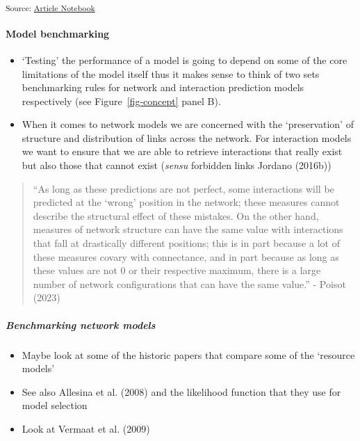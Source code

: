 \documentclass[
]{article}
\let\oldparagraph\paragraph
\renewcommand{\paragraph}[1]{\oldparagraph{#1}\mbox{}}
\let\oldsubparagraph\subparagraph
\renewcommand{\subparagraph}[1]{\oldsubparagraph{#1}\mbox{}}
\begin{document}
\textsubscript{Source:
\href{https://BecksLab.github.io/ms_t_is_for_topology/index.qmd.html}{Article
Notebook}}

\paragraph{Model benchmarking}\label{model-benchmarking}

\begin{itemize}
\item
  `Testing' the performance of a model is going to depend on some of the
  core limitations of the model itself thus it makes sense to think of
  two sets benchmarking rules for network and interaction prediction
  models respectively (see Figure~\ref{fig-concept} panel B).
\item
  When it comes to network models we are concerned with the
  `preservation' of structure and distribution of links across the
  network. For interaction models we want to ensure that we are able to
  retrieve interactions that really exist but also those that cannot
  exist (\emph{sensu} forbidden links Jordano (2016b))
\end{itemize}

\begin{quote}
``As long as these predictions are not perfect, some interactions will
be predicted at the `wrong' position in the network; these measures
cannot describe the structural effect of these mistakes. On the other
hand, measures of network structure can have the same value with
interactions that fall at drastically different positions; this is in
part because a lot of these measures covary with connectance, and in
part because as long as these values are not 0 or their respective
maximum, there is a large number of network configurations that can have
the same value.'' - Poisot (2023)
\end{quote}

\subparagraph{Benchmarking network
models}\label{benchmarking-network-models}

\begin{itemize}
\item
  Maybe look at some of the historic papers that compare some of the
  `resource models'
\item
  See also Allesina et al. (2008) and the likelihood function that they
  use for model selection
\item
  Look at Vermaat et al. (2009)
\end{itemize}
\end{document}
